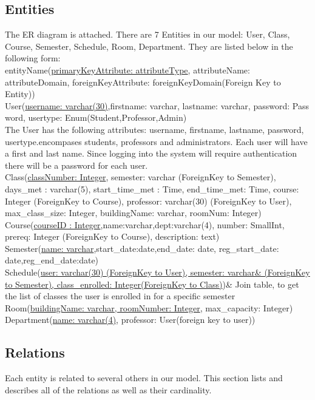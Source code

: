 \documentclass[11pt,oneside,a4paper]{article}
\begin{document}
\subsection{Entities}
The ER diagram is attached. There are 7 Entities in our model: User, Class, Course, Semester, Schedule, Room, Department.  They are listed below in the following form:
\\
entityName(\underline{primaryKeyAttribute: attributeType}, attributeName: attributeDomain, foreignKeyAttribute: foreignKeyDomain(Foreign Key to Entity))
\\
User(\underline{username: varchar(30)},firstname: varchar, lastname: varchar, password: Pass	word, usertype: Enum(Student,Professor,Admin)
\\
The User has the following attributes: username, firstname, lastname, 
password, usertype.encompases students, professors and administrators.  
Each user will have a first and last name. Since logging into the system 
will require authentication there will be a password for each user.
\\
Class(\underline{classNumber: Integer}, semester: varchar (ForeignKey to
Semester), days\_met : varchar(5), start\_time\_met : Time, end\_time\_met:
Time, course: Integer (ForeignKey to Course), professor: varchar(30)
(ForeignKey to User), max\_class\_size: Integer, buildingName: varchar,
roomNum: Integer)
\\
Course(\underline{courseID	: Integer},name:varchar,dept:varchar(4), 
number: SmallInt, prereq: Integer (ForeignKey to Course), description: text)
\\
Semester(\underline{name: varchar},start\_date:date,end\_date: date, 
reg\_start\_date: date,reg\_end\_date:date)
\\
Schedule(\underline{user: varchar(30) (ForeignKey to User), semester: varchar\&
(ForeignKey to Semester), class\_enrolled: Integer(ForeignKey to Class)})\& 
Join table, to get the list of classes the user is enrolled in for a specific
semester
\\
Room(\underline{buildingName: varchar, roomNumber: Integer}, max\_capacity: Integer)
Department(\underline{name: varchar(4)}, professor: User(foreign key to user))
\subsection{Relations} 
Each entity is related to several others in our model.  This section lists and describes 
all of the relations as well as their cardinality. 
\\
\end{document}
